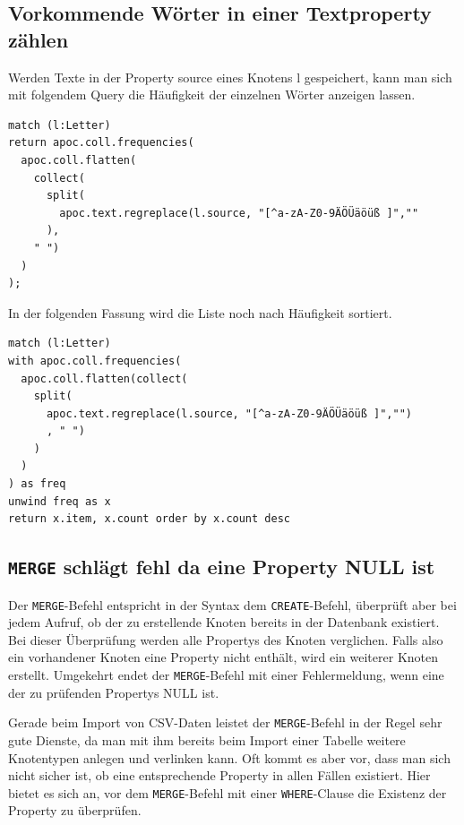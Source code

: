 \hypertarget{vorkommende-wuxf6rter-in-einer-textproperty-zuxe4hlen}{%
\subsection{Vorkommende Wörter in einer Textproperty
zählen}\label{vorkommende-wuxf6rter-in-einer-textproperty-zuxe4hlen}}

Werden Texte in der Property source eines Knotens l gespeichert, kann
man sich mit folgendem Query die Häufigkeit der einzelnen Wörter
anzeigen lassen.

\begin{verbatim}
match (l:Letter)
return apoc.coll.frequencies(
  apoc.coll.flatten(
    collect(
      split(
        apoc.text.regreplace(l.source, "[^a-zA-Z0-9ÄÖÜäöüß ]",""
      ),
    " ")
  )
);
\end{verbatim}

In der folgenden Fassung wird die Liste noch nach Häufigkeit sortiert.

\begin{verbatim}
match (l:Letter)
with apoc.coll.frequencies(
  apoc.coll.flatten(collect(
    split(
      apoc.text.regreplace(l.source, "[^a-zA-Z0-9ÄÖÜäöüß ]","")
      , " ")
    )
  )
) as freq
unwind freq as x
return x.item, x.count order by x.count desc
\end{verbatim}

\hypertarget{merge-schluxe4gt-fehl-da-eine-property-null-ist}{%
\subsection{\texorpdfstring{\texttt{MERGE} schlägt fehl da eine Property
NULL
ist}{MERGE schlägt fehl da eine Property NULL ist}}\label{merge-schluxe4gt-fehl-da-eine-property-null-ist}}

Der \texttt{MERGE}-Befehl entspricht in der Syntax dem
\texttt{CREATE}-Befehl, überprüft aber bei jedem Aufruf, ob der zu
erstellende Knoten bereits in der Datenbank existiert. Bei dieser
Überprüfung werden alle Propertys des Knoten verglichen. Falls also ein
vorhandener Knoten eine Property nicht enthält, wird ein weiterer Knoten
erstellt. Umgekehrt endet der \texttt{MERGE}-Befehl mit einer
Fehlermeldung, wenn eine der zu prüfenden Propertys NULL ist.

Gerade beim Import von CSV-Daten leistet der \texttt{MERGE}-Befehl in
der Regel sehr gute Dienste, da man mit ihm bereits beim Import einer
Tabelle weitere Knotentypen anlegen und verlinken kann. Oft kommt es
aber vor, dass man sich nicht sicher ist, ob eine entsprechende Property
in allen Fällen existiert. Hier bietet es sich an, vor dem
\texttt{MERGE}-Befehl mit einer \texttt{WHERE}-Clause die Existenz der
Property zu überprüfen.


